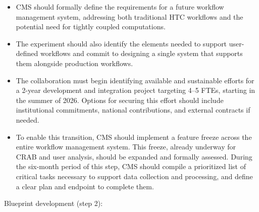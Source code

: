 \begin{itemize}
    \item CMS should formally define the requirements for a future workflow management system, addressing both traditional HTC workflows and the potential need for tightly coupled computations.
    
    \item The experiment should also identify the elements needed to support user-defined workflows and commit to designing a single system that supports them alongside production workflows.
    
    \item The collaboration must begin identifying available and sustainable efforts for a 2-year development and integration project targeting 4--5 FTEs, starting in the summer of 2026. Options for securing this effort should include institutional commitments, national contributions, and external contracts if needed.
    
    \item To enable this transition, CMS should implement a feature freeze across the entire workflow management system. This freeze, already underway for CRAB and user analysis, should be expanded and formally assessed. During the six-month period of this step, CMS should compile a prioritized list of critical tasks necessary to support \RunThree data collection and processing, and define a clear plan and endpoint to complete them. 
 \end{itemize} 
 
Blueprint development (step 2):

